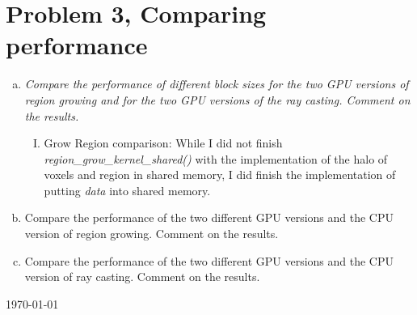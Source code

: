 \documentclass[fontsize=11pt, paper=a4, titlepage]{article}
\begin{document}
\section*{Problem 3, Comparing performance}
\begin{enumerate}[a)]

    \item \textit{Compare the performance of different block sizes for the two
GPU versions of region growing and for the two GPU versions of the ray
casting. Comment on the results.}

    \begin{enumerate}[I)]
        \item Grow Region comparison:
        While I did not finish \textit{region_grow_kernel_shared()} with the
implementation of the halo of voxels and region in shared memory, I did finish
the implementation of putting \textit{data} into shared memory.

    \end{enumerate}


    \item Compare the performance of the two different GPU versions and the CPU
version of region growing. Comment on the results.

    \item Compare the performance of the two different GPU versions and the CPU
version of ray casting. Comment on the results.

\end{enumerate}

\vfill
\hfill \large{\today}
\end{document}
